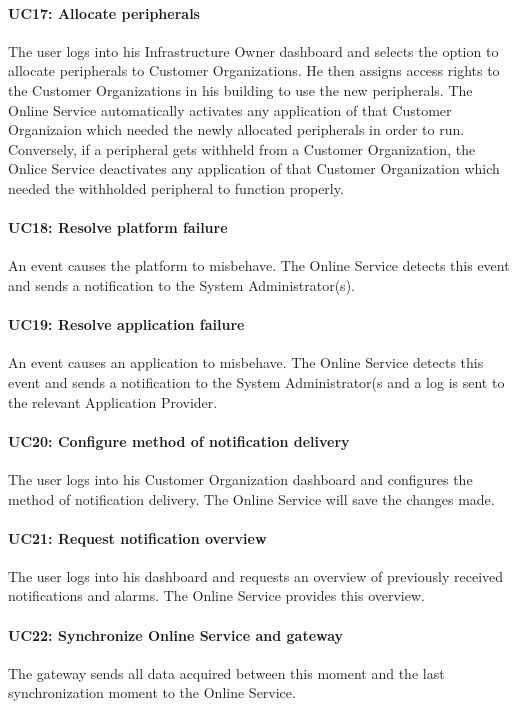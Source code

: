 \documentclass[english]{sareport}
\begin{document}
\paragraph{UC17: Allocate peripherals}
The user logs into his Infrastructure Owner dashboard and selects the option to allocate peripherals to Customer Organizations. He then assigns access rights to the Customer Organizations in his building to use the new peripherals. The Online Service automatically activates any application of that Customer Organizaion which needed the newly allocated peripherals in order to run. Conversely, if a peripheral gets withheld from a Customer Organization, the Onlice Service deactivates any application of that Customer Organization which needed the withholded peripheral to function properly.

\paragraph{UC18: Resolve platform failure}
An event causes the platform to misbehave. The Online Service detects this event and sends a notification to the System Administrator(s).

\paragraph{UC19: Resolve application failure}
An event causes an application to misbehave. The Online Service detects this event and sends a notification to the System Administrator(s and a log is sent to the relevant Application Provider.

\paragraph{UC20: Configure method of notification delivery}
The user logs into his Customer Organization dashboard and configures the method of notification delivery. The Online Service will save the changes made.

\paragraph{UC21: Request notification overview}
The user logs into his dashboard and requests an overview of previously received notifications and alarms. The Online Service provides this overview.

\paragraph{UC22: Synchronize Online Service and gateway}
The gateway sends all data acquired between this moment and the last synchronization moment to the Online Service.
\end{document}
